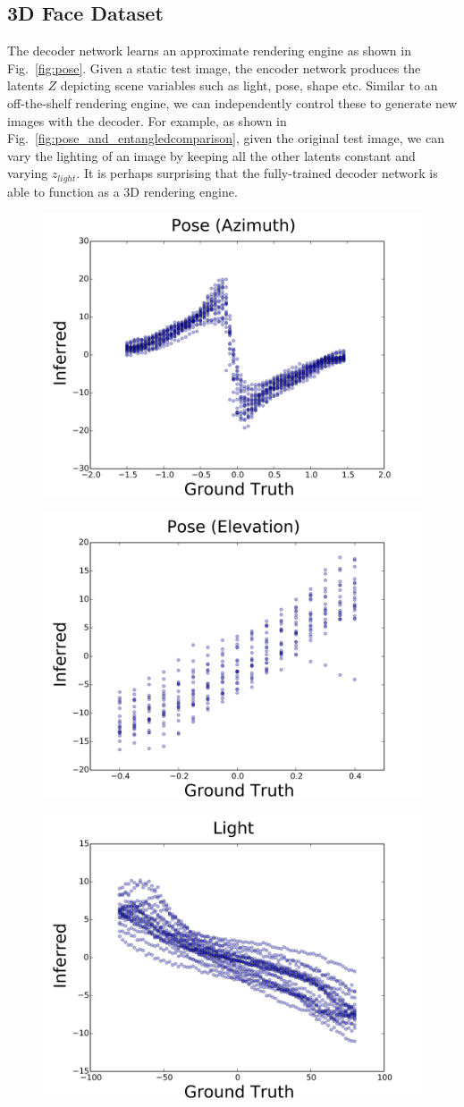 \documentclass[12pt,twoside]{mitthesis}
\begin{document}
\subsection{3D Face Dataset}\label{sec:gen}

The decoder network learns an approximate rendering engine as shown in
Fig.~\ref{fig:pose}. Given a static test image, the encoder network
produces the latents \(Z\) depicting scene variables such as light,
pose, shape etc. Similar to an off-the-shelf rendering engine, we can
independently control these to generate new images with the decoder. For
example, as shown in Fig.~\ref{fig:pose_and_entangledcomparison}, given
the original test image, we can vary the lighting of an image by keeping
all the other latents constant and varying \(z_{light}\). It is perhaps
surprising that the fully-trained decoder network is able to function as
a 3D rendering engine.

\hypertarget{fig:gen}{}
\begin{figure}[htbp]
\centering
\includegraphics[height=0.40000\textwidth]{../figures/AZ_VARIED_scatter.png}
\caption{}
\end{figure}

\begin{figure}[htbp]
\centering
\includegraphics[height=0.40000\textwidth]{../figures/EL_VARIED_scatter.png}
\caption{}
\end{figure}

\begin{figure}[htbp]
\centering
\includegraphics[height=0.40000\textwidth]{../figures/LIGHT_AZ_VARIED_scatter.png}
\caption{}
\end{figure}
\end{document}
